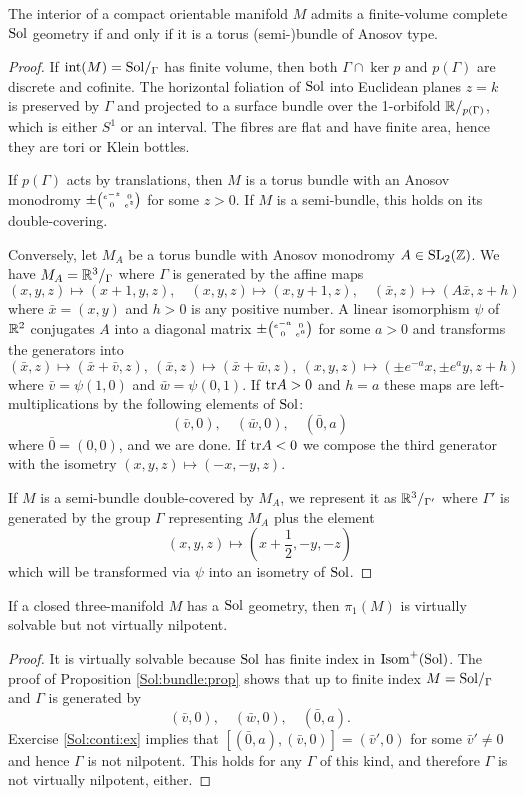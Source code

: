 \begin{prop} \label{Sol:bundle:prop}
The interior of a compact orientable manifold $M$ admits a finite-volume complete ${\rm Sol}$ geometry if and only if it is a torus (semi-)bundle of Anosov type.
\end{prop}
\begin{proof}
If ${\rm int}(M)= {\rm Sol}/_\Gamma$ has finite volume, then both $\Gamma \cap \ker p$ and $p(\Gamma)$ are discrete and cofinite. The horizontal foliation of ${\rm Sol}$ into Euclidean planes $z=k$ is preserved by $\Gamma$ and projected to a surface bundle over the 1-orbifold $\mathbb{R} /_{p(\Gamma)}$, which is either $S^1$ or an interval. The fibres are flat and have finite area, hence they are tori or Klein bottles. 

If $p(\Gamma)$ acts by translations, then $M$ is a torus bundle with an Anosov monodromy $\pm\matr {e^{-z}} 0 0 {e^z}$ for some $z>0$. If $M$ is a semi-bundle, this holds on its double-covering.

Conversely, let $M_A$ be a torus bundle with Anosov monodromy $A\in {\rm SL}_2(\mathbb{Z})$. We have $M_A = \mathbb{R}^3/_\Gamma$ where $\Gamma$ is generated by the affine maps
$$(x,y,z) \mapsto (x+1,y,z), \quad (x,y,z) \mapsto (x,y+1,z), \quad (\bar x,z) \mapsto 
(A\bar x, z+h)$$
where $\bar x = (x,y)$ and $h>0$ is any positive number. A linear isomorphism $\psi$ of $\mathbb{R}^2$ conjugates $A$ into a diagonal matrix $\pm\matr {e^{-a}} 0 0 {e^a}$ for some $a>0$ and transforms the generators into
$$(\bar x,z) \mapsto (\bar x +\bar v ,z), \ (\bar x,z) \mapsto (\bar x + \bar w, z), \ (x,y,z) \mapsto (\pm e^{-a}x, \pm e^{a}y, z+h)$$
where $\bar v = \psi(1,0)$ and $\bar w = \psi(0,1)$. If ${\rm tr} A>0$ and $h=a$ these maps are left-multiplications by the following elements of ${\rm Sol}$:
$$(\bar v,0), \quad (\bar w,0), \quad (\bar 0,a)$$
where $\bar 0 = (0,0)$, and we are done. If ${\rm tr} A <0$ we compose the third generator with the isometry $(x,y,z)\mapsto (-x,-y,z)$. 

If $M$ is a semi-bundle double-covered by $M_A$, we represent it as $\mathbb{R}^3/_{\Gamma'}$ where $\Gamma'$ is generated by the group $\Gamma$ representing $M_A$ plus the element
$$(x,y,z) \mapsto \left(x+\frac 12, -y, -z\right)$$
which will be transformed via $\psi$ into an isometry of ${\rm Sol}$.
\end{proof}

\begin{cor} \label{Sol:not:Nil:cor}
If a closed three-manifold $M$ has a ${\rm Sol}$ geometry, then $\pi_1(M)$ is virtually solvable but not virtually nilpotent.
\end{cor}
\begin{proof}
It is virtually solvable because ${\rm Sol}$ has finite index in ${\rm Isom}^+({\rm Sol})$. The proof of Proposition \ref{Sol:bundle:prop} shows that
up to finite index $M={\rm Sol}/_\Gamma$ and $\Gamma$ is generated by
$$(\bar v,0), \quad (\bar w,0), \quad (\bar 0,a).$$
Exercise \ref{Sol:conti:ex} implies that $[(\bar 0,a), (\bar v,0)] = (\bar v',0)$ for some $\bar v' \neq 0$ and hence $\Gamma$ is not nilpotent. This holds for any $\Gamma$ of this kind, and therefore $\Gamma$ is not virtually nilpotent, either.
\end{proof}

